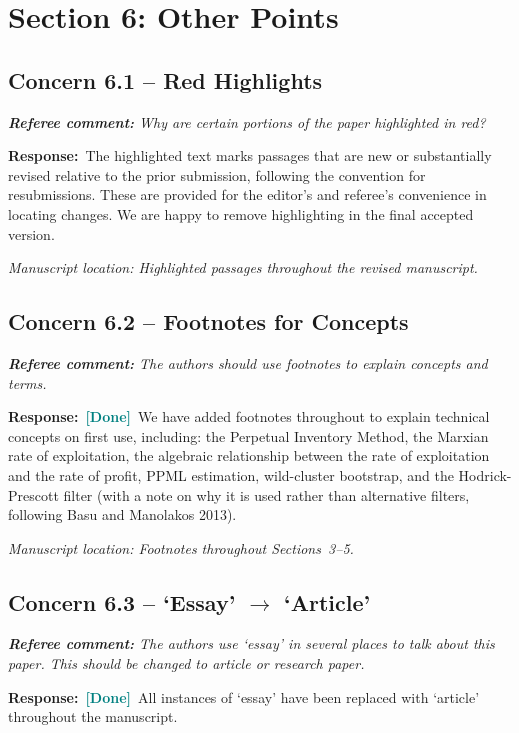 \documentclass[11pt]{article}
\newcommand{\RC}[1]{\begin{refereebox}\textit{\textbf{Referee comment:} #1}\end{refereebox}}
\newcommand{\AR}{\noindent\textbf{Response:}\ }
\newcommand{\done}{\textcolor{teal}{\textbf{[Done]}}}
\begin{document}
\section*{Section 6: Other Points}

\subsection*{Concern 6.1 -- Red Highlights}

\RC{Why are certain portions of the paper highlighted in red?}

\AR The highlighted text marks passages that are new or substantially revised relative to the prior submission, following the convention for resubmissions. These are provided for the editor's and referee's convenience in locating changes. We are happy to remove highlighting in the final accepted version.

\smallskip\noindent\textit{Manuscript location: Highlighted passages throughout the revised manuscript.}

\subsection*{Concern 6.2 -- Footnotes for Concepts}

\RC{The authors should use footnotes to explain concepts and terms.}

\AR \done\ We have added footnotes throughout to explain technical concepts on first use, including: the Perpetual Inventory Method, the Marxian rate of exploitation, the algebraic relationship between the rate of exploitation and the rate of profit, PPML estimation, wild-cluster bootstrap, and the Hodrick-Prescott filter (with a note on why it is used rather than alternative filters, following Basu and Manolakos 2013).

\smallskip\noindent\textit{Manuscript location: Footnotes throughout Sections~3--5.}

\subsection*{Concern 6.3 -- `Essay' $\to$ `Article'}

\RC{The authors use `essay' in several places to talk about this paper. This should be changed to article or research paper.}

\AR \done\ All instances of `essay' have been replaced with `article' throughout the manuscript.
\end{document}
